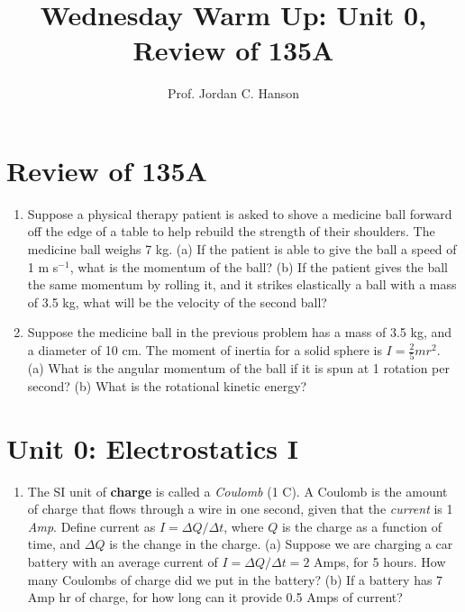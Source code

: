 \documentclass{article}
\begin{document}
\twocolumn

\title{Wednesday Warm Up: Unit 0, Review of 135A}
\author{Prof. Jordan C. Hanson}

\maketitle

\section{Review of 135A}

\begin{enumerate}
\item Suppose a physical therapy patient is asked to shove a medicine ball forward off the edge of a table to help rebuild the strength of their shoulders.  The medicine ball weighs 7 kg.  (a) If the patient is able to give the ball a speed of 1 m s$^{-1}$, what is the momentum of the ball? (b) If the patient gives the ball the same momentum by rolling it, and it strikes elastically a ball with a mass of 3.5 kg, what will be the velocity of the second ball? \\ \vspace{4cm}
\item Suppose the medicine ball in the previous problem has a mass of 3.5 kg, and a diameter of 10 cm.  The moment of inertia for a solid sphere is $I = \frac{2}{5} m r^2$. (a) What is the angular momentum of the ball if it is spun at 1 rotation per second? (b) What is the rotational kinetic energy? \\ \vspace{4cm}
\end{enumerate}
\section{Unit 0: Electrostatics I}
\begin{enumerate}
\item The SI unit of \textbf{charge} is called a \textit{Coulomb} (1 C).  A Coulomb is the amount of charge that flows through a wire in one second, given that the \textit{current} is 1 \textit{Amp}. Define current as $I = \Delta Q/\Delta t$, where $Q$ is the charge as a function of time, and $\Delta Q$ is the change in the charge.  (a)  Suppose we are charging a car battery with an average current of $I = \Delta Q/\Delta t = 2$ Amps, for 5 hours.  How many Coulombs of charge did we put in the battery? (b) If a battery has 7 Amp hr of charge, for how long can it provide 0.5 Amps of current? \\ \vspace{4cm}
\end{enumerate}
\end{document}
